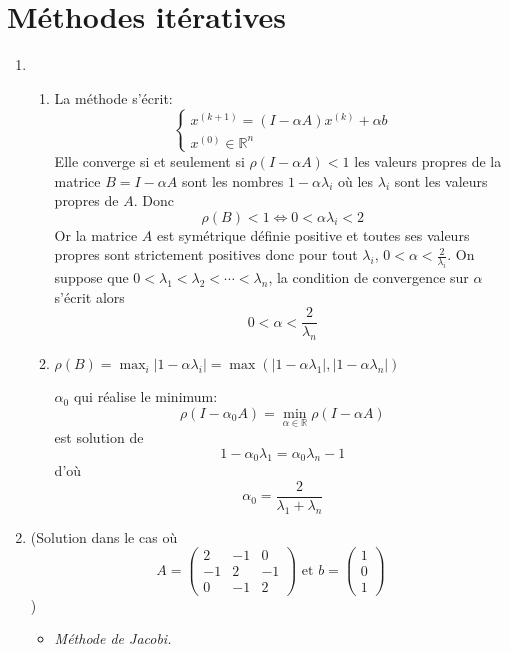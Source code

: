 \documentclass[a4paper]{article}
\begin{document}
\section{Méthodes itératives}
\begin{enumerate}
\item 
\begin{enumerate}
\item La méthode s'écrit:
\[\left\{\begin{array}{l}
x^{(k+1)}=(I-\alpha A)x^{(k)}+\alpha b\\
x^{(0)}\in\mathbb{R}^n

\end{array}\right.
\]
Elle converge si et seulement si $\displaystyle \rho(I-\alpha A)<1$ les valeurs propres de la matrice $B= I-\alpha A$ sont les nombres $1-\alpha \lambda_i$ où les $\lambda_i$ sont les valeurs propres de $A$. Donc
 \[\rho(B)<1\Longleftrightarrow 0<\alpha \lambda_i<2\]
  Or la matrice $A$ est symétrique définie positive et toutes ses valeurs propres sont strictement positives donc pour tout $\lambda_i$, $0<\alpha<\frac 2{\lambda_i}$. On suppose que $0<\lambda_1<\lambda_2<\cdots <\lambda_n$, la condition de convergence sur $\alpha$ s'écrit alors
\[0<\alpha<\frac 2{\lambda_n}\] 
\item $\rho(B)=\max_i\left|1-\alpha \lambda_i\right|=\max\left(\left|1-\alpha \lambda_1\right|,\left|1-\alpha \lambda_n\right|\right)$

\begin{center}

\end{center}


$\alpha_0$ qui réalise le minimum:
\[\rho(I-\alpha_0A)=\min_{\alpha\in\mathbb{R}}\rho(I-\alpha A)\]
est solution de 
\[1-\alpha_0 \lambda_1=\alpha_0 \lambda_n-1\]
d'où
\[\alpha_0=\frac 2{\lambda_1+\lambda_n}\]
\end{enumerate}





\item 
(Solution dans le cas où 
\[A=\left(\begin{array}{ccc}
2&-1&0\\
-1&2&-1\\
0&-1&2
\end{array}\right)
\mbox{ et }b=\left(\begin{array}{c}
1\\0\\1 
\end{array}\right)
\] )
\begin{itemize}
\item {\it Méthode de Jacobi.} 



\end{itemize}
\end{enumerate}
\end{document}
